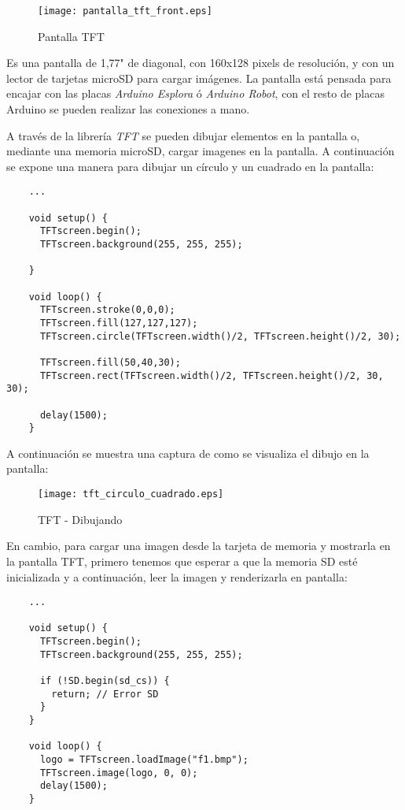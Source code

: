 \begin{figure}[h!]
    \centering
    \texttt{[image: pantalla\_tft\_front.eps]}
    \caption{Pantalla TFT}\label{fig:arduino-tft-front}
\end{figure}



Es una pantalla de 1,77" de diagonal, con 160x128 pixels de resolución, y con un lector de tarjetas microSD para cargar imágenes. La pantalla está pensada para encajar con las placas \emph{Arduino Esplora} ó \emph{Arduino Robot}, con el resto de placas Arduino se pueden realizar las conexiones a mano.

A través de la librería \emph{TFT} se pueden dibujar elementos en la pantalla o, mediante una memoria microSD, cargar imagenes en la pantalla. A continuación se expone una manera para dibujar un círculo y un cuadrado en la pantalla:

\begin{lstlisting}
    ...

    void setup() {
      TFTscreen.begin();
      TFTscreen.background(255, 255, 255);

    }

    void loop() {
      TFTscreen.stroke(0,0,0);
      TFTscreen.fill(127,127,127);
      TFTscreen.circle(TFTscreen.width()/2, TFTscreen.height()/2, 30);

      TFTscreen.fill(50,40,30);
      TFTscreen.rect(TFTscreen.width()/2, TFTscreen.height()/2, 30, 30);

      delay(1500);
    }
\end{lstlisting}

A continuación se muestra una captura de como se visualiza el dibujo en la pantalla:

\begin{figure}[h!]
    \centering
    \texttt{[image: tft\_circulo\_cuadrado.eps]}
    \caption{TFT - Dibujando}\label{fig:tft_circulo_cuadrado}
\end{figure}

En cambio, para cargar una imagen desde la tarjeta de memoria y mostrarla en la pantalla TFT, primero tenemos que esperar a que la memoria SD esté inicializada y a continuación, leer la imagen y renderizarla en pantalla:

\begin{lstlisting}
    ...

    void setup() {
      TFTscreen.begin();
      TFTscreen.background(255, 255, 255);

      if (!SD.begin(sd_cs)) {
        return; // Error SD
      }
    }

    void loop() {
      logo = TFTscreen.loadImage("f1.bmp");
      TFTscreen.image(logo, 0, 0);
      delay(1500);
    }
\end{lstlisting}

